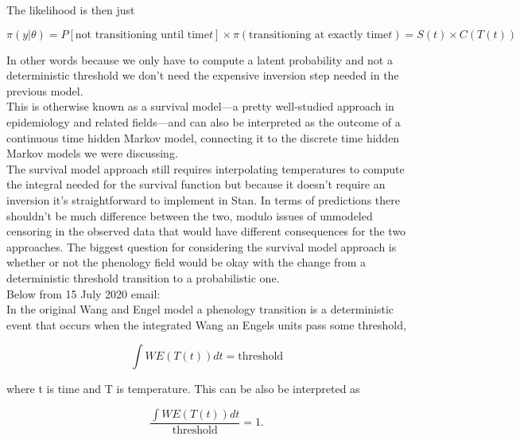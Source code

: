 \documentclass[11pt,letter]{article}
\begin{document}
The likelihood is then just

\begin{center}
\begin{equation*}
\pi(y | \theta)
= P[\mbox{not transitioning until time} t] \times \pi(\mbox{transitioning at exactly time} t)
= S(t) \times C(T(t))
\end{equation*}
\end{center}

In other words because we only have to compute a latent probability
and not a deterministic threshold we don’t need the expensive inversion 
step needed in the previous model.\\

This is otherwise known as a survival model---a pretty well-studied 
approach in epidemiology and related fields---and can also be 
interpreted as the outcome of a continuous time hidden Markov 
model, connecting it to the discrete time hidden Markov models we
were discussing.\\

The survival model approach still requires interpolating temperatures
to compute the integral needed for the survival function but because 
it doesn’t require an inversion it’s straightforward to implement in Stan.
In terms of predictions there shouldn’t be much difference between the 
two, modulo issues of unmodeled censoring in the observed data that 
would have different consequences for the two approaches.  The biggest 
question for considering the survival model approach is  whether or not 
the phenology field would be okay with the change from a deterministic 
threshold transition to a probabilistic one.\\

Below from 15 July 2020 email:\\
 
In the original Wang and Engel model a phenology transition is a deterministic 
event that occurs when the integrated Wang an Engels units pass some threshold,

\begin{equation*}
\int WE(T(t)) dt = \mbox{threshold}
\end{equation*}

where t is time and T is temperature.  This can be also be interpreted as

\begin{equation*}
\frac{\int WE(T(t)) dt} {\mbox{threshold}} = 1.
\end{equation*}
\end{document}
